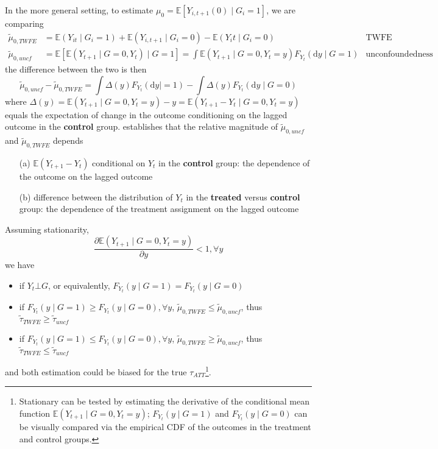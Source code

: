\documentclass[twoside]{article}
\begin{document}
In the more general setting, to estimate $\mu_0 = \mathbb{E}\left[Y_{i,t+1}(0)\mid G_i=1\right]$, 
we are comparing 
\begin{align*}
    \tilde{\mu}_{0,TWFE} &= \mathbb{E}\left(Y_{it}\mid G_i=1\right) + \mathbb{E}\left(Y_{i,t+1}\mid G_i=0\right) - \mathbb{E}\left(Y_it\mid G_i=0\right) & \text{TWFE}\\
    \tilde{\mu}_{0,uncf} &= \mathbb{E}\left[\mathbb{E}\left(Y_{t+1}\mid G=0,Y_t\right)\mid G=1\right] = \int \mathbb{E}\left(Y_{t+1}\mid G=0,Y_t=y\right)F_{Y_t}\left(\mathrm{d}y\mid G=1\right) & \text{unconfoundedness}
\end{align*}
the difference between the two is then
\begin{equation*}
    \tilde{\mu}_{0,uncf}-\tilde{\mu}_{0,TWFE} = \int \Delta (y) F_{Y_t}\left(\mathrm{d}y\mid =1\right) - \int \Delta(y)F_{Y_t}\left(\mathrm{d}y\mid G=0\right)
\end{equation*}
where $\Delta (y)=\mathbb{E}\left(Y_{t+1}\mid G=0,Y_t=y\right)-y = \mathbb{E}\left(Y_{t+1}-Y_t\mid G=0,Y_t=y\right)$ equals the expectation of change in the outcome conditioning on the lagged outcome in the \textbf{control} group.
\citet{ding2019bracketing} establishes that the relative magnitude of $\tilde{\mu}_{0,uncf}$ and $\tilde{\mu}_{0,TWFE}$ depends 
\begin{itemize}
    \item[(a)] $\mathbb{E}\left(Y_{t+1}-Y_t\right)$ conditional on $Y_t$ in the \textbf{control} group: the dependence of the outcome on the lagged outcome
    \item[(b)] difference between the distribution of $Y_t$ in the \textbf{treated} versus \textbf{control} group: the dependence of the treatment assignment on the lagged outcome
\end{itemize}
Assuming stationarity, $$ \frac{\partial \mathbb{E}\left(Y_{t+1}\mid G=0,Y_t=y\right)}{\partial y}<1,\forall y $$we have
\begin{itemize}
    \item if $Y_t \bot G $, or equivalently, $F_{Y_t}\left(y\mid G=1\right) = F_{Y_t}\left(y\mid G=0\right)$
    \item if $F_{Y_t}(y\mid G=1)\geq F_{Y_t}(y\mid G=0), \forall y$, $\tilde{\mu}_{0,TWFE}\leq \tilde{\mu}_{0,uncf}$, thus $\tilde{\tau}_{TWFE}\geq \tilde{\tau}_{uncf}$
    \item if $F_{Y_t}(y\mid G=1)\leq F_{Y_t}(y\mid G=0), \forall y$, $\tilde{\mu}_{0,TWFE}\geq \tilde{\mu}_{0,uncf}$, thus $\tilde{\tau}_{TWFE}\leq \tilde{\tau}_{uncf}$
\end{itemize}
and both estimation could be biased for the true ${\tau}_{ATT}$\footnote{Stationary can be tested by estimating the derivative of the conditional mean function $\mathbb{E}\left(Y_{t+1}\mid G=0,Y_t=y\right)$; $F_{Y_t}\left(y\mid G=1\right)$ and $F_{Y_t}\left(y\mid G=0\right)$ can be visually compared via the empirical CDF of the outcomes in the treatment and control groups.}.
\end{document}
